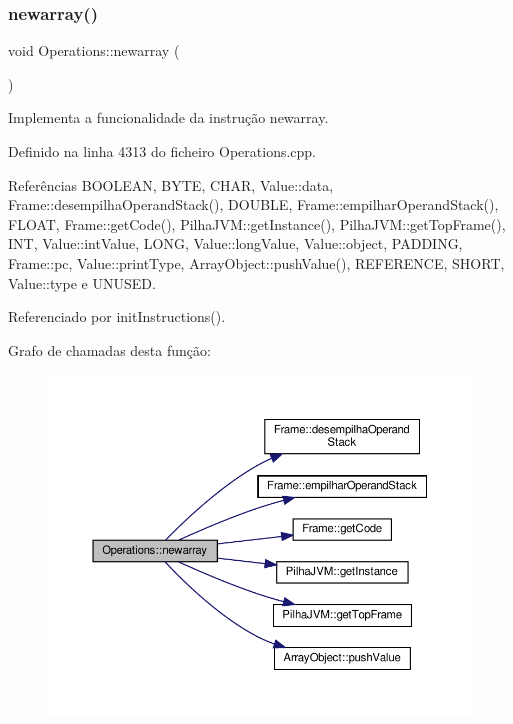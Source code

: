 \subsubsection{\texorpdfstring{newarray()}{newarray()}}
{\footnotesize\ttfamily void Operations\+::newarray (\begin{DoxyParamCaption}{ }\end{DoxyParamCaption})\hspace{0.3cm}{\ttfamily [private]}}



Implementa a funcionalidade da instrução newarray. 



Definido na linha 4313 do ficheiro Operations.\+cpp.



Referências B\+O\+O\+L\+E\+AN, B\+Y\+TE, C\+H\+AR, Value\+::data, Frame\+::desempilha\+Operand\+Stack(), D\+O\+U\+B\+LE, Frame\+::empilhar\+Operand\+Stack(), F\+L\+O\+AT, Frame\+::get\+Code(), Pilha\+J\+V\+M\+::get\+Instance(), Pilha\+J\+V\+M\+::get\+Top\+Frame(), I\+NT, Value\+::int\+Value, L\+O\+NG, Value\+::long\+Value, Value\+::object, P\+A\+D\+D\+I\+NG, Frame\+::pc, Value\+::print\+Type, Array\+Object\+::push\+Value(), R\+E\+F\+E\+R\+E\+N\+CE, S\+H\+O\+RT, Value\+::type e U\+N\+U\+S\+ED.



Referenciado por init\+Instructions().

Grafo de chamadas desta função\+:\nopagebreak
\begin{figure}[H]
\begin{center}
\leavevmode
\includegraphics[width=350pt]{classOperations_a3537f097b63240202ac0c9249dda33a9_cgraph}
\end{center}
\end{figure}
\mbox{\label{classOperations_a3426eecc1b88f11cc8317f99d430a201}} 
